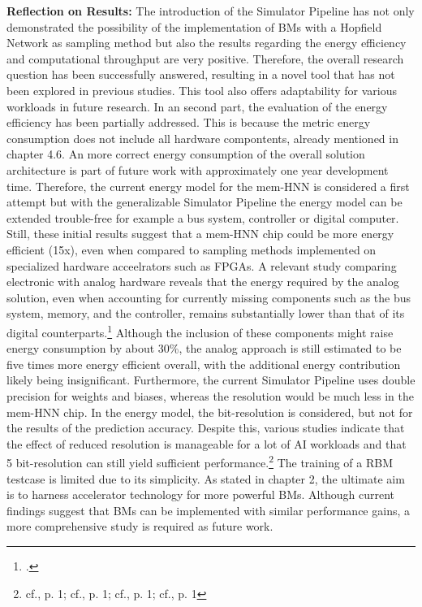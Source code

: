 \textbf{Reflection on Results:} The introduction of the Simulator Pipeline has not only demonstrated the possibility 
of the implementation of \ac{BM}s with a Hopfield Network as sampling method but also the results regarding
the energy efficiency and computational throughput are very positive.
Therefore, the overall research question has been successfully answered, resulting in a novel tool that has not been explored in previous studies.
This tool also offers adaptability for various workloads in future research.
In an second part, the evaluation of the energy efficiency has been partially addressed.
This is because the metric energy consumption does not include all hardware compontents, already mentioned in chapter 4.6.
An more correct energy consumption of the overall solution architecture is part of future work with approximately one year development time.
Therefore, the current energy model for the \ac{mem-HNN} is considered a first attempt but with the generalizable Simulator Pipeline
the energy model can be extended trouble-free for example a bus system, controller or digital computer.
Still, these initial results suggest that a \ac{mem-HNN} chip could be more energy efficient (15x), even when compared to sampling methods implemented on specialized hardware acceelrators such as \ac{FPGA}s.
A relevant study comparing electronic with analog hardware reveals that the energy required by the analog solution, even when accounting for currently missing components such as the bus system, memory, and the controller, remains substantially lower than that of its digital counterparts.\footcite[cf.][12-13]{demirkiranElectroPhotonicSystemAccelerating2023}
Although the inclusion of these components might raise energy consumption by about 30\%, the analog approach is still estimated to be five times more energy efficient overall, with the additional energy contribution likely being insignificant.
Furthermore, the current Simulator Pipeline uses double precision for weights and biases, whereas the resolution would be much less in the \ac{mem-HNN} chip.
In the energy model, the bit-resolution is considered, but not for the results of the prediction accuracy. 
Despite this, various studies indicate that the effect of reduced resolution is manageable for a lot of AI workloads and that 5 bit-resolution can still yield sufficient performance.\footnote{cf.\cite{maEra1bitLLMs2024}, p. 1; cf.\cite{GitHubHtqinQuantSR}, p. 1; cf.\cite{rouhaniMicroscalingDataFormats2023}, p. 1; cf.\cite{rouhaniSharedMicroexponentsLittle2023}, p. 1}
The training of a \ac{RBM} testcase is limited due to its simplicity.
As stated in chapter 2, the ultimate aim is to harness accelerator technology for more powerful \ac{BM}s.
Although current findings suggest that \ac{BM}s can be implemented with similar performance gains, a more comprehensive study is required as future work.

